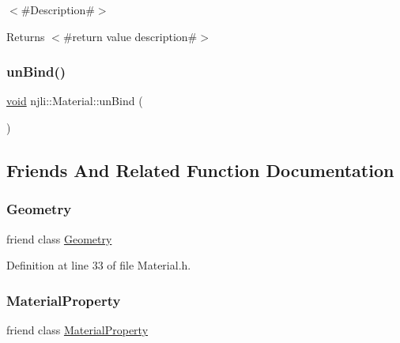$<$\#\+Description\#$>$

\begin{DoxyReturn}{Returns}
$<$\#return value description\#$>$ 
\end{DoxyReturn}
\mbox{\label{classnjli_1_1_material_a2c33a9199d78c0feaffcb566fa0f4fd2}} 
\subsubsection{\texorpdfstring{un\+Bind()}{unBind()}}
{\footnotesize\ttfamily \mbox{\hyperlink{_thread_8h_af1e856da2e658414cb2456cb6f7ebc66}{void}} njli\+::\+Material\+::un\+Bind (\begin{DoxyParamCaption}{ }\end{DoxyParamCaption})\hspace{0.3cm}{\ttfamily [protected]}}



\subsection{Friends And Related Function Documentation}
\mbox{\label{classnjli_1_1_material_a9aca7b7350e6ffa0e2d6320834ad1857}} 
\subsubsection{\texorpdfstring{Geometry}{Geometry}}
{\footnotesize\ttfamily friend class \mbox{\hyperlink{classnjli_1_1_geometry}{Geometry}}\hspace{0.3cm}{\ttfamily [friend]}}



Definition at line 33 of file Material.\+h.

\mbox{\label{classnjli_1_1_material_ae7c7f3376b81514442fbc2a5fe2f5ec9}} 
\subsubsection{\texorpdfstring{Material\+Property}{MaterialProperty}}
{\footnotesize\ttfamily friend class \mbox{\hyperlink{classnjli_1_1_material_property}{Material\+Property}}\hspace{0.3cm}{\ttfamily [friend]}}



